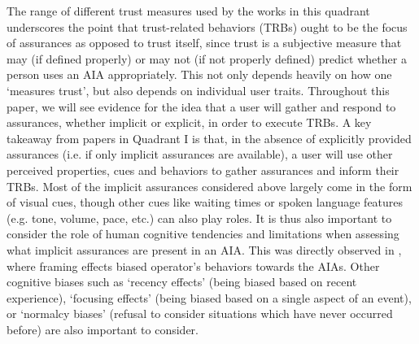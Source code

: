 The range of different trust measures used by the works in this quadrant underscores the point that trust-related behaviors (TRBs) ought to be the focus of assurances as opposed to trust itself, since trust is a subjective measure that may (if defined properly) or may not (if not properly defined) predict whether a person uses an AIA appropriately. 
This not only depends heavily on how one `measures trust', but also depends on individual user traits. 
Throughout this paper, we will see evidence for the idea that a user will gather and respond to assurances, whether implicit or explicit, in order to execute TRBs. 
A key takeaway from papers in Quadrant I is that, in the absence of explicitly provided assurances (i.e. if only implicit assurances are available), a user will use other perceived properties, cues and behaviors to gather assurances and inform their TRBs. 
Most of the implicit assurances considered above largely come in the form of visual cues, though other cues like waiting times or spoken language features (e.g. tone, volume, pace, etc.) can also play roles. 
It is thus also important to consider the role of human cognitive tendencies and limitations when assessing what implicit assurances are present in an AIA. %
This was directly observed in \cite{Freedy2007-sg,Riley1996-qm}, where framing effects biased operator's behaviors towards the AIAs. 
Other cognitive biases such as `recency effects' (being biased based on recent experience), `focusing effects' (being biased based on a single aspect of an event), or `normalcy biases' (refusal to consider situations which have never occurred before) are also important to consider. 
%

